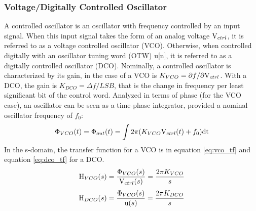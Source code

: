		\subsubsection{Voltage/Digitally Controlled Oscillator}
			A controlled oscillator is an oscillator with frequency controlled by an input signal. When this input signal takes the form of an analog voltage $\textnormal{V}_{ctrl}$, it is referred to as a voltage controlled oscillator (VCO). Otherwise, when controlled digitally with an oscillator tuning word (OTW) u[n], it is referred to as a digitally controlled oscillator (DCO). Nominally, a controlled oscillator is characterized by its gain, in the case of a VCO is $K_{VCO} = \partial f/\partial \textnormal{V}_{ctrl}$. With a DCO, the gain is $K_{DCO} = \Delta f/LSB$, that is the change in frequency per least significant bit of the control word. Analyzed in terms of phase (for the VCO case), an oscillator can be seen as a time-phase integrator, provided a nominal oscillator frequency of $f_0$:
			\begin{equation}\label{eq:vco_ph}
				\Phi_{VCO}(t) = \Phi_{out}(t) = \int2\pi(K_{VCO}\textnormal{V}_{ctrl}(t) + f_0)\mathrm{dt}
			\end{equation}
			In the s-domain, the transfer function for a VCO is in equation \ref{eq:vco_tf} and equation \ref{eq:dco_tf} for a DCO. 
			\begin{equation}\label{eq:vco_tf}
				\mathrm{H}_{VCO}(s) = \frac{\Phi_{VCO}(s)}{\textnormal{V}_{ctrl}(s)} = \frac{2\pi K_{VCO}}{s}
			\end{equation}
			\begin{equation}\label{eq:dco_tf}
				\mathrm{H}_{DCO}(s) = \frac{\Phi_{VCO}(s)}{\textnormal{u}(s)} =  \frac{2\pi K_{DCO}}{s}
			\end{equation}

